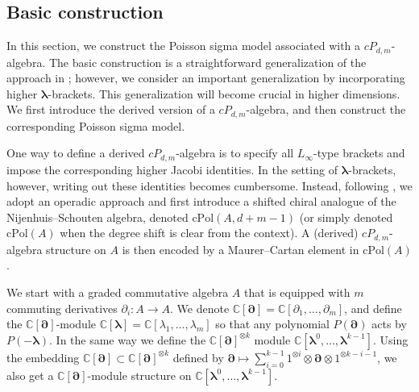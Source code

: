 \documentclass[11pt]{article}
\newcommand{\C}{\mathbb{C}}
\numberwithin{equation}{section}
\begin{document}
 \subsection{Basic construction}
In this section, we construct the Poisson sigma model associated with a $cP_{d,m}$-algebra. The basic construction is a straightforward generalization of the approach in \cite{khan2025poisson}; however, we consider an important generalization by incorporating higher $\boldsymbol{\lambda}$-brackets. This generalization will become crucial in higher dimensions. We first introduce the derived version of a $cP_{d,m}$-algebra, and then construct the corresponding Poisson sigma model.

One way to define a derived $cP_{d,m}$-algebra is to specify all $L_\infty$-type brackets and impose the corresponding higher Jacobi identities. In the setting of $\boldsymbol{\lambda}$-brackets, however, writing out these identities becomes cumbersome. Instead, following \cite{de2013variational,bakalov2019operadic}, we adopt an operadic approach and first introduce a shifted chiral analogue of the Nijenhuis--Schouten algebra, denoted $\mathrm{cPol}(A,d+m-1)$ (or simply denoted $\mathrm{cPol}(A)$ when the degree shift is clear from the context). A (derived) $cP_{d,m}$-algebra structure on $A$ is then encoded by a Maurer--Cartan element in $\mathrm{cPol}(A)$.

We start with a graded commutative algebra $A$ that is equipped with $m$ commuting derivatives $\partial_i: A \to A$. We denote $\C[\boldsymbol{\partial}] = \C[\partial_1,\dots,\partial_m]$, and define the $\C[\boldsymbol{\partial}]$-module $\C[\boldsymbol{\lambda}] = \C[\lambda_1,\dots,\lambda_m]$ so that any polynomial $P(\boldsymbol{\partial})$ acts by $P(-\boldsymbol{\lambda})$. In the same way we define the $\C[\boldsymbol{\partial}]^{\otimes k}$ module $\C[\boldsymbol{\lambda}^{0},\dots,\boldsymbol{\lambda}^{k-1}]$. Using the embedding $\C[\boldsymbol{\partial}] \subset \C[\boldsymbol{\partial}]^{\otimes k}$ defined by $\boldsymbol{\partial} \mapsto \sum_{i = 0}^{k-1} 1^{\otimes i} \otimes \boldsymbol{\partial} \otimes 1^{\otimes k-i-1}$, we also get a $\C[\boldsymbol{\partial}]$-module structure on $\C[\boldsymbol{\lambda}^{0},\dots,\boldsymbol{\lambda}^{k-1}]$.
\end{document}
